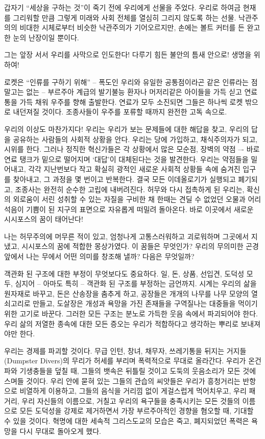 \documentclass[10pt, b6paper, openany]{memoir}
\begin{document}
\begin{article}
갑자기 ``세상을 구하는 것''이 죽기 전에 우리에게 선물을 주었다. 우리로 하여금 현재를 그리워할 만큼 그렇게 미래와 사회 전체를 열심히 그리지 않도록 하는 선물. 낙관주의의 비대한 시체로부터 비슷한 낙관주의가 기어오르지만, 손에는 볼트 커터를 든 완고한 눈의 난장이일 뿐이다.

그는 앞장 서서 우리를 사막으로 인도한다! 다루기 힘든 불안의 틈새 안으로! 생명을 위하여! 

로켓은 ``인류를 구하기 위해'' --  폭도인 우리와 유일한 공통점이라곤 같은 인류라는 점 말고는 없는 -- 부르주아 계급의 발기불능 환자나 머저리같은 아이들을 가득 싣고 연료통을 가득 채워 우주를 향해 출발한다. 연료가 모두 소진되면 그들은 하나씩 로켓 밖으로 내던져질 것이다. 조종사들이 우주를 포류할 때까지 완전한 고독 속으로. 

우리의 이상도 마찬가지다! 우리는 우리가 보는 문제들에 대한 해답을 찾고, 우리의 답을 공유하는 사람들의 사회적 상황을 안다. 우리는 당에 가입하고, 채식주의자가 되고, 시위를 한다. 그러나 정직한 혁신가들은 각 상황에서 많은 모순점, 장벽의 약점 –- 바로 연료 탱크가 밑으로 떨어지며 `대답'이 대체된다는 것을 발견한다. 우리는 약점들을 밀어내고, 각각 지난번보다 작고 확실히 광적인 새로운 사회적 상황들 속에 숨겨진 입구를 찾아내고, 그 과정을 몇 번이고 반복한다. 결국 모든 이데올로기가 실행되고 폐기되고, 조종사는 완전히 순수한 고립에 내버려진다. 허무와 다시 접촉하게 된 우리는, 확신의 외로움이 서린 성취할 수 있는 자질을 구비한 채 한때는 견딜 수 없었던 오물과 어리석음이 기쁨이 된 지구의 표면으로 자유롭게 떠밀려 돌아온다. 바로 이곳에서 새로운 시시포스의 꿈이 태어난다! 

나는 허무주의에 머무른 적이 있고, 엄청나게 고통스러워하고 괴로워하며 그곳에서 지냈고, 시시포스의 꿈에 적합한 몽상가였다. 이 꿈들은 무엇인가? 우리의 무의미한 곤경 앞에서 나는 무에서 어떤 의미를 창조해 낼까? 다음은 무엇일까? 

객관화 된 구조에 대한 부정이 무엇보다도 중요하다. 일, 돈, 상품, 선입견, 도덕성 모두, 심지어 -- 아마도 특히 -- 객관화 된 구조를 부정하는 금언까지. 시계는 우리의 삶을 원자재로 바꾸고, 돈은 산송장을 춤추게 하고, 공장들은 개개의 나무를 나무 모양의 열쇠고리로 만들고, 도살장은 개성과 욕망을 가진 존재들을 구역질나는 대중들을 먹이기 위한 고기로 바꾼다. 그러한 모든 구조는 분노로 가득한 웃음 속에서 파괴되어야 한다. 우리 삶의 저열한 종속에 대한 모든 증오는 우리가 적합하다고 생각하는 뿌리로 보내져야만 한다. 

우리는 경제를 파괴할 것이다. 무급 인턴, 창녀, 채무자, 쓰레기통을 뒤지는 거지들(Dumpster Divers)의 무리가 허세를 부리며 폭력적으로 무대로 올라간다. 우리가 온건파와 기생충들을 덮칠 때, 그들의 뱃속은 뒤틀릴 것이고 도둑의 웃음소리가 모든 것에 스며들 것이다. 우리 안에 묻혀 있는 그들의 관습의 씨앗들은 우리가 흥청거리는 반항으로 비열하게 이용하고, 그들의 음식을 거리낌 없이 게걸스럽게 먹어치우고, 우리 패거리, 우리 자신들의 이름으로, 거칠고 우리의 욕구들을 충족시키는 모든 것들의 이름으로 모든 도덕성을 강제로 제거하면서 가장 부르주아적인 경향을 혐오할 때, 기대할 수 있을 것이다. 혁명에 대한 세속적 그리스도교의 모습은 죽고, 폐지되었던 폭력은 욕망을 다시 무대로 돌아오게 했다. 


\end{article}
\end{document}
